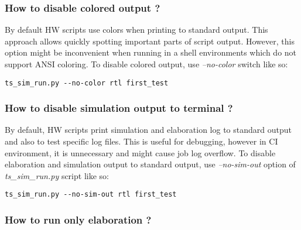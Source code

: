 \documentclass{tropic_design_spec}
\begin{document}
\subsubsection{How to disable colored output ?}
\label{sec:how-to-disable-colored-output}

By default HW scripts use colors when printing to standard output. This approach
allows quickly spotting important parts of script output. However, this option
might be inconvenient when running in a shell environments which do not support
ANSI coloring. To disable colored output, use \textit{--no-color} switch like so:

\begin{lstlisting}
ts_sim_run.py --no-color rtl first_test
\end{lstlisting}


\subsubsection{How to disable simulation output to terminal ?}
\label{sec:how-to-disable-simulation-output-to-terminal}

By default, HW scripts print simulation and elaboration log to standard output and also
to test specific log files. This is useful for debugging, however in CI environment,
it is unnecessary and might cause job log overflow. To disable elaboration
and simulation output to standard output, use \textit{--no-sim-out} option
of \textit{ts_sim_run.py} script like so:

\begin{lstlisting}
ts_sim_run.py --no-sim-out rtl first_test
\end{lstlisting}


\subsubsection{How to run only elaboration ?}
\label{sec:how-to-run-only-elaboration}
\end{document}
